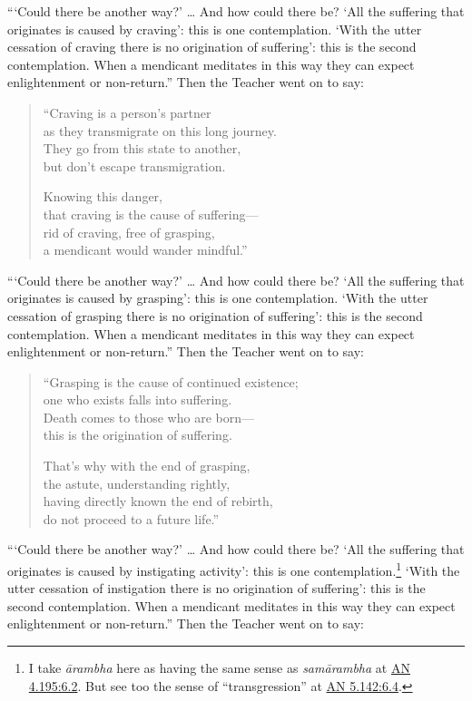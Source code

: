 \documentclass[12pt,openany]{book}%
\begin{document}
“‘Could there be another way?’ … And how could there be? ‘All the suffering that originates is caused by craving’: this is one contemplation. ‘With the utter cessation of craving there is no origination of suffering’: this is the second contemplation. When a mendicant meditates in this way they can expect enlightenment or non-return.” Then the Teacher went on to say: 

\begin{verse}%
“Craving is a person’s partner \\
as they transmigrate on this long journey. \\
They go from this state to another, \\
but don’t escape transmigration. 

Knowing this danger, \\
that craving is the cause of suffering—\\
rid of craving, free of grasping, \\
a mendicant would wander mindful.” 

%
\end{verse}

“‘Could there be another way?’ … And how could there be? ‘All the suffering that originates is caused by grasping’: this is one contemplation. ‘With the utter cessation of grasping there is no origination of suffering’: this is the second contemplation. When a mendicant meditates in this way they can expect enlightenment or non-return.” Then the Teacher went on to say: 

\begin{verse}%
“Grasping is the cause of continued existence; \\
one who exists falls into suffering. \\
Death comes to those who are born—\\
this is the origination of suffering. 

That’s why with the end of grasping, \\
the astute, understanding rightly, \\
having directly known the end of rebirth, \\
do not proceed to a future life.” 

%
\end{verse}

“‘Could there be another way?’ … And how could there be? ‘All the suffering that originates is caused by instigating activity’: this is one contemplation.\footnote{I take \textit{\textsanskrit{ārambha}} here as having the same sense as \textit{\textsanskrit{samārambha}} at \href{https://suttacentral.net/an4.195/en/sujato\#6.2}{AN 4.195:6.2}. But see too the sense of “transgression” at \href{https://suttacentral.net/an5.142/en/sujato\#6.4}{AN 5.142:6.4}. } ‘With the utter cessation of instigation there is no origination of suffering’: this is the second contemplation. When a mendicant meditates in this way they can expect enlightenment or non-return.” Then the Teacher went on to say: 
\end{document}
